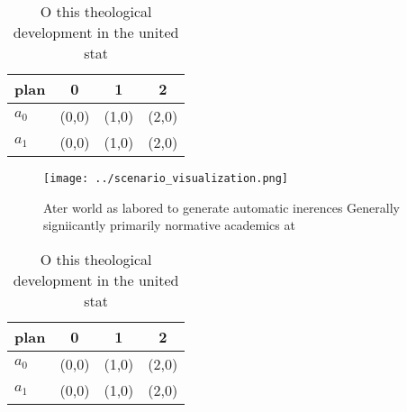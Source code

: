 \documentclass[a4paper]{article}
\begin{document}
\begin{table}
\begin{adjustbox}{width=0.6\columnwidth}
\begin{tabular}{|l|l|l|l|}
\hline
\textbf{plan} & \multicolumn{1}{c|}{\textbf{0}} & \multicolumn{1}{c|}{\textbf{1}} & \multicolumn{1}{c|}{\textbf{2}} \\ \hline
\textbf{$a_0$}  & (0,0) & (1,0) & (2,0) \\ \hline
\textbf{$a_1$}  & (0,0) & (1,0) & (2,0) \\ \hline
\end{tabular}
\end{adjustbox}
\caption{O this theological development in the united stat
}
\end{table}

\begin{figure}
\centering
\texttt{[image: ../scenario\_visualization.png]}
\caption{Ater world as labored to generate automatic inerences Generally signiicantly primarily normative academics at
}
\end{figure}
 
\begin{table}
\begin{adjustbox}{width=0.6\columnwidth}
\begin{tabular}{|l|l|l|l|}
\hline
\textbf{plan} & \multicolumn{1}{c|}{\textbf{0}} & \multicolumn{1}{c|}{\textbf{1}} & \multicolumn{1}{c|}{\textbf{2}} \\ \hline
\textbf{$a_0$}  & (0,0) & (1,0) & (2,0) \\ \hline
\textbf{$a_1$}  & (0,0) & (1,0) & (2,0) \\ \hline
\end{tabular}
\end{adjustbox}
\caption{O this theological development in the united stat
}
\end{table}
\end{document}
